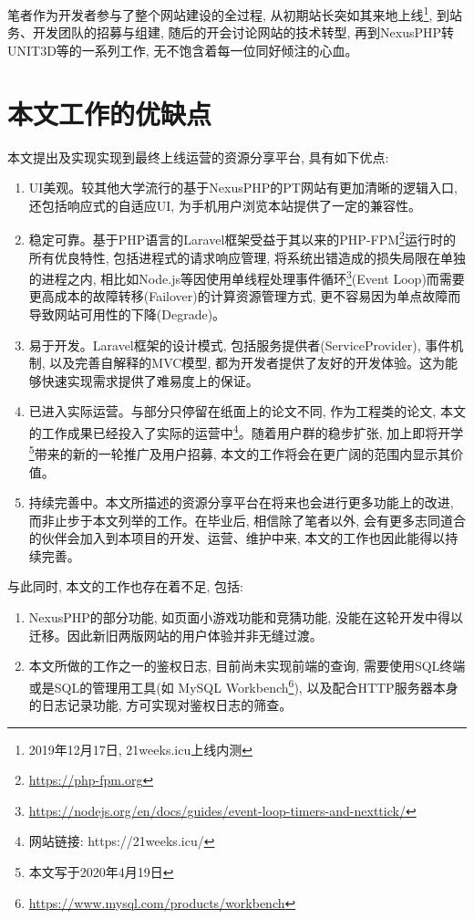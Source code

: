 笔者作为开发者参与了整个网站建设的全过程, 从初期站长突如其来地上线\footnote{2019年12月17日, 21weeks.icu上线内测}, 到站务、开发团队的招募与组建, 随后的开会讨论网站的技术转型, 再到NexusPHP转UNIT3D等的一系列工作, 无不饱含着每一位同好倾注的心血。

\section{本文工作的优缺点}

本文提出及实现实现到最终上线运营的资源分享平台, 具有如下优点:

\begin{enumerate}[label=(\arabic*),leftmargin=*]
\item UI美观。较其他大学流行的基于NexusPHP的PT网站有更加清晰的逻辑入口, 还包括响应式的自适应UI, 为手机用户浏览本站提供了一定的兼容性。

\item 稳定可靠。基于PHP语言的Laravel框架受益于其以来的PHP-FPM\footnote{\url{https://php-fpm.org}}运行时的所有优良特性, 包括进程式的请求响应管理, 将系统出错造成的损失局限在单独的进程之内, 相比如Node.js等因使用单线程处理事件循环\footnote{\url{https://nodejs.org/en/docs/guides/event-loop-timers-and-nexttick/}}(Event Loop)而需要更高成本的故障转移(Failover)的计算资源管理方式, 更不容易因为单点故障而导致网站可用性的下降(Degrade)。

\item 易于开发。Laravel框架的设计模式, 包括服务提供者(ServiceProvider), 事件机制, 以及完善自解释的MVC模型, 都为开发者提供了友好的开发体验。这为能够快速实现需求提供了难易度上的保证。

\item 已进入实际运营。与部分只停留在纸面上的论文不同, 作为工程类的论文, 本文的工作成果已经投入了实际的运营中\footnote{网站链接: https://21weeks.icu/}。随着用户群的稳步扩张, 加上即将开学\footnote{本文写于2020年4月19日}带来的新的一轮推广及用户招募, 本文的工作将会在更广阔的范围内显示其价值。

\item 持续完善中。本文所描述的资源分享平台在将来也会进行更多功能上的改进, 而非止步于本文列举的工作。在毕业后, 相信除了笔者以外, 会有更多志同道合的伙伴会加入到本项目的开发、运营、维护中来, 本文的工作也因此能得以持续完善。
\end{enumerate}


与此同时, 本文的工作也存在着不足, 包括:
\begin{enumerate}[label=(\arabic*),leftmargin=*]
\item NexusPHP的部分功能, 如页面小游戏功能和竞猜功能, 没能在这轮开发中得以迁移。因此新旧两版网站的用户体验并非无缝过渡。

\item 本文所做的工作之一的鉴权日志, 目前尚未实现前端的查询, 需要使用SQL终端或是SQL的管理用工具(如 MySQL Workbench\footnote{\url{https://www.mysql.com/products/workbench}}), 以及配合HTTP服务器本身的日志记录功能, 方可实现对鉴权日志的筛查。
\end{enumerate}

